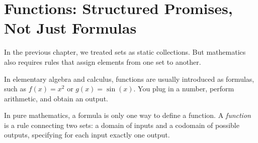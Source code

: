 \section{Functions: Structured Promises, Not Just Formulas}
\chapterline

In the previous chapter, we treated sets as static collections. But mathematics also requires rules that assign elements from one set to another.

In elementary algebra and calculus, functions are usually introduced as formulas, such as $f(x) = x^2$ or $g(x) = \sin(x)$. You plug in a number, perform arithmetic, and obtain an output.

In pure mathematics, a formula is only one way to define a function. A \emph{function} is a rule connecting two sets: a domain of inputs and a codomain of possible outputs, specifying for each input exactly one output.

